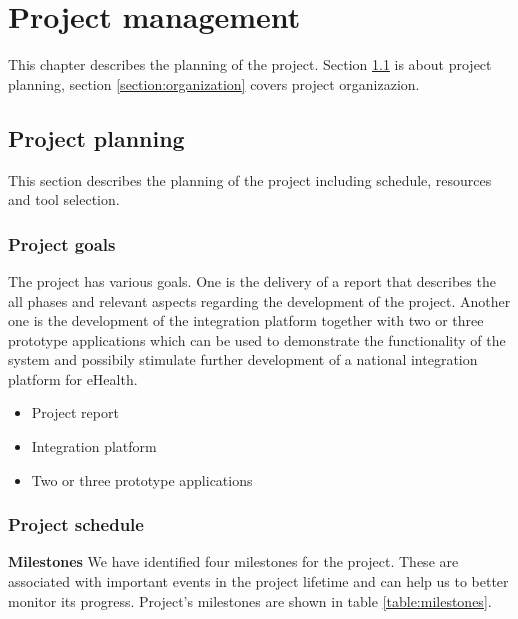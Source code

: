 \chapter{Project management}

\label{ch:management}

This chapter describes the planning of the project. Section \ref{section:planning} is about project planning,
section \ref{section:organization} covers project organizazion.

\section{Project planning}
\label{section:planning}
This section describes the planning of the project including schedule, resources and tool selection.

\subsection{Project goals}
The project has various goals. One is the delivery of a report that describes the all phases and relevant aspects regarding the development of the project. Another one is the development of the integration platform together with two or three prototype applications which can be used to demonstrate the functionality of the system and possibily stimulate further development of a national integration platform for eHealth.

\begin{itemize}
\item Project report
\item Integration platform
\item Two or three prototype applications
\end{itemize}


\subsection{Project schedule}

\textbf{Milestones} \newline
We have identified four milestones for the project. These are associated with important events in the project lifetime and can help us to better monitor its progress. Project's milestones are shown in table \ref{table:milestones}.

